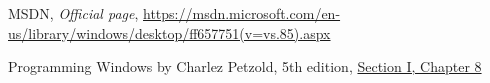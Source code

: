\begin{thebibliography}{99999}
\singlespace\normalsize

 MSDN, \textit{Official page}, \url{https://msdn.microsoft.com/en-us/library/windows/desktop/ff657751(v=vs.85).aspx}


 Programming Windows by Charlez Petzold, 5th edition, \url{Section I, Chapter 8}

\end{thebibliography}
